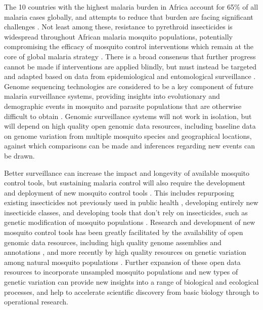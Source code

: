 \documentclass[a4paper,11pt,abstracton,hidelinks]{scrartcl}
\begin{document}
%
The 10 countries with the highest malaria burden in Africa account for 65\% of all malaria cases globally, and attempts to reduce that burden are facing significant challenges \cite{WHO2018b}.
%
Not least among these, resistance to pyrethroid insecticides is widespread throughout African malaria mosquito populations, potentially compromising the efficacy of mosquito control interventions which remain at the core of global malaria strategy \cite{Hemingway2016, WHO2018a}.
%
There is a broad consensus that further progress cannot be made if interventions are applied blindly, but must instead be targeted and adapted based on data from epidemiological and entomological surveillance \cite{WHO2015}.
%
Genome sequencing technologies are considered to be a key component of future malaria surveillance systems, providing insights into evolutionary and demographic events in mosquito and parasite populations that are otherwise difficult to obtain \cite{Ishengoma2019}.
%
Genomic surveillance systems will not work in isolation, but will depend on high quality open genomic data resources, including baseline data on genome variation from multiple mosquito species and geographical locations, against which comparisons can be made and inferences regarding new events can be drawn.

%
Better surveillance can increase the impact and longevity of available mosquito control tools, but sustaining malaria control will also require the development and deployment of new mosquito control tools \cite{WHO2015}.
%
This includes repurposing existing insecticides not previously used in public health \cite{Oxborough2019, Lees2019}, developing entirely new insecticide classes, and developing tools that don't rely on insecticides, such as genetic modification of mosquito populations \cite{kyrou2018}.
%
Research and development of new mosquito control tools has been greatly facilitated by the availability of open genomic data resources, including high quality genome assemblies and annotations \cite{Holt2002, sharakhova2007update}, and more recently by high quality resources on genetic variation among natural mosquito populations \cite{Ag1000G2017}. 
%
Further expansion of these open data resources to incorporate unsampled mosquito populations and new types of genetic variation can provide new insights into a range of biological and ecological processes, and help to accelerate scientific discovery from basic biology through to operational research.
\end{document}
